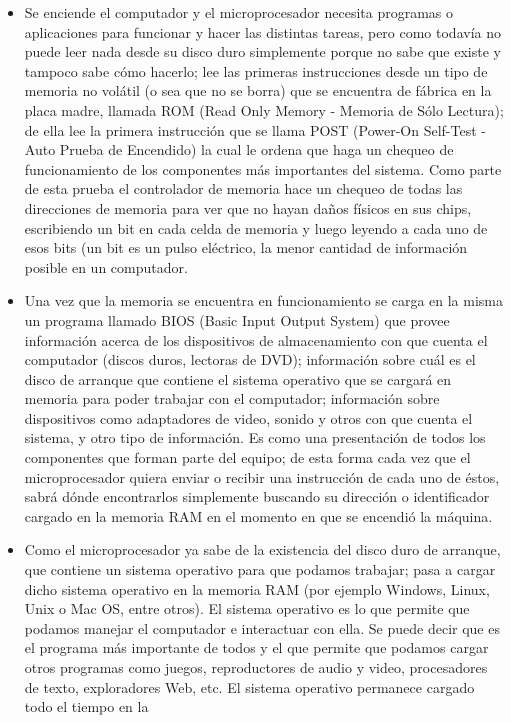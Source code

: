 \documentclass{article}
\begin{document}
\begin{itemize}
\item Se enciende el computador y el microprocesador necesita programas o aplicaciones para
funcionar y hacer las distintas tareas, pero como todavía no puede leer nada desde su disco
duro simplemente porque no sabe que existe y tampoco sabe cómo hacerlo; lee las primeras
instrucciones desde un tipo de memoria no volátil (o sea que no se borra) que se encuentra
de fábrica en la placa madre, llamada ROM (Read Only Memory - Memoria de Sólo Lectura);
de ella lee la primera instrucción que se llama POST (Power-On Self-Test - Auto Prueba de
Encendido) la cual le ordena que haga un chequeo de funcionamiento de los componentes
más importantes del sistema. Como parte de esta prueba el controlador de memoria hace
un chequeo de todas las direcciones de memoria para ver que no hayan daños físicos en sus
chips, escribiendo un bit en cada celda de memoria y luego leyendo a cada uno de esos bits
(un bit es un pulso eléctrico, la menor cantidad de información posible en un computador.
\item Una vez que la memoria se encuentra en funcionamiento se carga en la misma un programa
llamado BIOS (Basic Input Output System) que provee información acerca de los
dispositivos de almacenamiento con que cuenta el computador (discos duros, lectoras de
DVD); información sobre cuál es el disco de arranque que contiene el sistema operativo que
se cargará en memoria para poder trabajar con el computador; información sobre
dispositivos como adaptadores de video, sonido y otros con que cuenta el sistema, y otro
tipo de información. Es como una presentación de todos los componentes que forman parte
del equipo; de esta forma cada vez que el microprocesador quiera enviar o recibir una
instrucción de cada uno de éstos, sabrá dónde encontrarlos simplemente buscando su
dirección o identificador cargado en la memoria RAM en el momento en que se encendió la
máquina.
\item Como el microprocesador ya sabe de la existencia del disco duro de arranque, que contiene
un sistema operativo para que podamos trabajar; pasa a cargar dicho sistema operativo en
la memoria RAM (por ejemplo Windows, Linux, Unix o Mac OS, entre otros). El sistema
operativo es lo que permite que podamos manejar el computador e interactuar con ella. Se
puede decir que es el programa más importante de todos y el que permite que podamos
cargar otros programas como juegos, reproductores de audio y video, procesadores de
texto, exploradores Web, etc. El sistema operativo permanece cargado todo el tiempo en la

\end{itemize}
\end{document}
